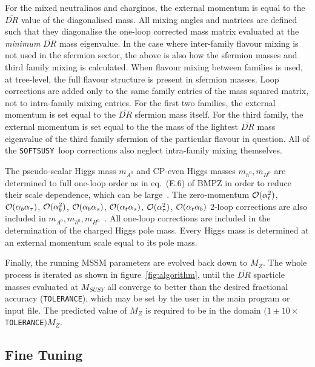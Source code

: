 \documentclass[]{article}
\def\at{\alpha_t}
\def\ab{\alpha_b}
\def\as{\alpha_s}
\def\atau{\alpha_{\tau}}
\def\oatab{{\cal O}(\at\ab)}
\def\oatas{{\cal O}(\at\as)}
\def\oabas{{\cal O}(\ab\as)}
\def\oatq{{\cal O}(\at^2)}
\def\oabq{{\cal O}(\ab^2)}
\def\oatauq{{\cal O}(\atau^2)}
\def\oabatau{{\cal O}(\ab \atau)}
\def\SOFTSUSY{{\tt SOFTSUSY}}
\def\code#1{\small{\tt #1}\normalsize}
\begin{document}
For the mixed neutralinos and charginos, the
external momentum is equal to the $\overline{DR}$ value of the diagonalised
mass.
All mixing angles and matrices are defined such that they diagonalise
the one-loop corrected mass matrix evaluated at the {\em minimum}
$\overline{DR}$ mass eigenvalue. In the case where inter-family flavour mixing
is not used in the sfermion sector, the above is also how the sfermion masses
and third family mixing is calculated. 
When flavour mixing between families is used, at
tree-level, the full flavour structure is present in sfermion masses.
Loop corrections are added only to the same family entries of the mass squared
matrix, not to
intra-family mixing entries. For the first two families, 
the external momentum is set equal to the $\overline{DR}$ sfermion mass
itself. For the third 
family, the external momentum is set equal to the the mass of the lightest
$\overline{DR}$ mass eigenvalue of the third family sfermion of the particular
flavour in question. 
All of the \SOFTSUSY~loop
corrections also neglect intra-family mixing themselves.

The pseudo-scalar Higgs  mass $m_{A^0}$ and CP-even Higgs masses $m_{h^0},
m_{H^0}$ are determined to full one-loop order
as in eq.~(E.6) of BMPZ in order to reduce
their scale dependence, which can be large~\cite{Katsikatsou:2000cd}. 
The zero-momentum $\oatq$, $\oabatau$, $\oabq$, $\oabas$, $\oatas$, $\oatauq$,
$\oatab$
2-loop corrections are 
also included in $m_{A^0}, m_{h^0},
m_{H^0}$~\cite{Degrassi:2001yf,Brignole:2001jy,Brignole:2002bz,Dedes:2003km}.
All one-loop corrections are included in
the determination of the charged Higgs pole mass.
Every Higgs mass is determined at an external momentum scale equal to its
pole mass. 

Finally, the running MSSM parameters are evolved back down to $M_Z$.
The whole process is iterated as shown in figure~\ref{fig:algorithm}, until the
$\overline{DR}$ sparticle masses evaluated at $M_{SUSY}$
all converge to better than the desired fractional accuracy
(\code{TOLERANCE}), which may be set by the user in the main program or input
file. The predicted value of $M_Z$ is required to be in the domain
$(1\pm10\times$\code{TOLERANCE}$)M_Z$.

\subsection{Fine Tuning \label{sec:finetune}}
\end{document}
